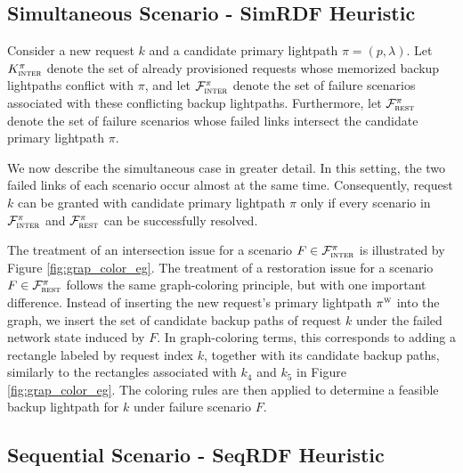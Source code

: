 \documentclass[conference]{IEEEtran}
\def \FailureSet      {\mathcal{F}}
\def \FailureIdx      {F}
\def \intersect {\textsc{inter}}
\def \lightPathIdx           {\pi}
\def \RequestIdx       {k}
\def \rest             {\textsc{rest}}   %
\def \w             {\textsc{w}}
\begin{document}

\subsection{Simultaneous Scenario - SimRDF Heuristic}
\label{sec: SimRDF}

Consider a new request $k$ and a candidate primary lightpath $\pi = (p, \lambda)$. Let $K_{\intersect}^{\pi}$ denote the set of already provisioned requests whose memorized backup lightpaths conflict with $\pi$, and let $\FailureSet_{\intersect}^{\pi}$ denote the set of failure scenarios associated with these conflicting backup lightpaths. Furthermore, let $\FailureSet_{\rest}^{\pi}$ denote the set of failure scenarios whose failed links intersect the candidate primary lightpath $\pi$.

We now describe the simultaneous case in greater detail. In this setting, the two failed links of each scenario occur almost at the same time. Consequently, request $k$ can be granted with candidate primary lightpath $\pi$ only if every scenario in $\FailureSet_{\intersect}^{\pi}$ and $\FailureSet_{\rest}^{\pi}$ can be successfully resolved.

The treatment of an intersection issue for a scenario $\FailureIdx \in \FailureSet_{\intersect}^{\pi}$ is illustrated by Figure \ref{fig:grap_color_eg}. The treatment of a restoration issue for a scenario $\FailureIdx \in \FailureSet_{\rest}^{\pi}$ follows the same graph-coloring principle, but with one important difference. Instead of inserting the new request's primary lightpath $\lightPathIdx^{\w}$ into the graph, we insert the set of candidate backup paths of request $\RequestIdx$ under the failed network state induced by $\FailureIdx$. In graph-coloring terms, this corresponds to adding a rectangle labeled by request index $k$, together with its candidate backup paths, similarly to the rectangles associated with $\RequestIdx_{4}$ and $\RequestIdx_{5}$ in Figure \ref{fig:grap_color_eg}. The coloring rules are then applied to determine a feasible backup lightpath for $\RequestIdx$ under failure scenario $\FailureIdx$.




\subsection{Sequential Scenario - SeqRDF Heuristic}
\label{sec: SeqRDF}
\end{document}
